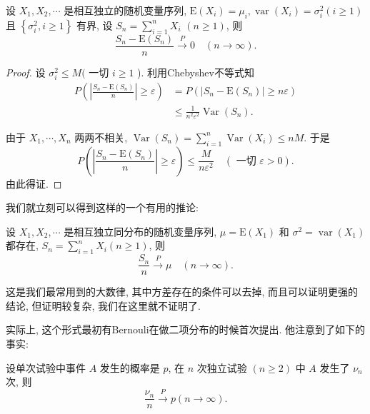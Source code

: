 \begin{theorem}[Chebyshev大数律] 
    设 $X_1, X_2, \cdots$ 是相互独立的随机变量序列, $\mathrm{E}\left(X_i\right)=\mu_i, \operatorname{var}\left(X_i\right)=\sigma_i^2(i \geqslant 1)$ 且 $\left\{\sigma_i^2, i \geqslant 1\right\}$ 有界, 设 $S_n=\sum_{i=1}^n X_i$ $(n \geqslant 1)$, 则
$$
\frac{S_n-\mathrm{E}\left(S_n\right)}{n} \stackrel{P}{\longrightarrow} 0 \quad(n \rightarrow \infty) .
$$
\end{theorem}

\begin{proof}
    设 $\sigma_i^2 \leqslant M($ 一切 $i \geqslant 1$ ). 利用Chebyshev不等式知
$$
\begin{aligned}
P\left(\left|\frac{S_n-\mathrm{E}\left(S_n\right)}{n}\right| \geqslant \varepsilon\right) & =P\left(\left|S_n-\mathrm{E}\left(S_n\right)\right| \geqslant n \varepsilon\right) \\
& \leqslant \frac{1}{n^2 \varepsilon^2} \operatorname{Var}\left(S_n\right) .
\end{aligned}
$$

由于 $X_1, \cdots, X_n$ 两两不相关, $\operatorname{Var}\left(S_n\right)=\sum_{i=1}^n \operatorname{Var}\left(X_i\right) \leqslant n M$. 于是
$$
P\left(\left|\frac{S_n-\mathrm{E}\left(S_n\right)}{n}\right| \geqslant \varepsilon\right) \leqslant \frac{M}{n \varepsilon^2} \quad(\text { 一切 } \varepsilon>0) .
$$
由此得证. 

\end{proof}

我们就立刻可以得到这样的一个有用的推论: 

\begin{corollary}
    设 $X_1, X_2, \cdots$ 是相互独立同分布的随机变量序列, $\mu=\mathrm{E}\left(X_1\right)$ 和 $\sigma^2=\operatorname{var}\left(X_1\right)$ 都存在, $S_n=\sum_{i=1}^n X_i(n \geqslant 1)$, 则
    $$
    \frac{S_n}{n} \stackrel{P}{\longrightarrow} \mu \quad(n \rightarrow \infty) .
    $$
\end{corollary}

这是我们最常用到的大数律, 其中方差存在的条件可以去掉, 而且可以证明更强的结论, 但证明较复杂, 我们在这里就不证明了. 

实际上, 这个形式最初有Bernouli在做二项分布的时候首次提出. 他注意到了如下的事实: 

\begin{corollary}
    设单次试验中事件 $A$ 发生的概率是 $p$, 在 $n$ 次独立试验 $(n \geqslant 2)$ 中 $A$ 发生了 $\nu_n$ 次, 则
$$
\frac{\nu_n}{n} \stackrel{P}{\longrightarrow} p(n \rightarrow \infty) .
$$
\end{corollary}

